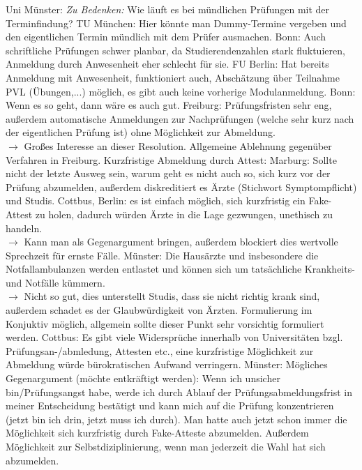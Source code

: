 \begin{outline}
        \1 Uni Münster: \textit{Zu Bedenken:} Wie läuft es bei mündlichen Prüfungen mit der Terminfindung?
          \2 TU München: Hier könnte man Dummy-Termine vergeben und den eigentlichen Termin mündlich mit dem Prüfer ausmachen.
        \1 Bonn: Auch schriftliche Prüfungen schwer planbar, da Studierendenzahlen stark fluktuieren, Anmeldung durch Anwesenheit eher schlecht für sie.
          \2 FU Berlin: Hat bereits Anmeldung mit Anwesenheit, funktioniert auch, Abschätzung über Teilnahme PVL (Übungen,...) möglich, es gibt auch keine vorherige Modulanmeldung.
          \2 Bonn: Wenn es so geht, dann wäre es auch gut.
        \1 Freiburg: Prüfungsfristen sehr eng, außerdem automatische Anmeldungen zur Nachprüfungen (welche sehr kurz nach der eigentlichen Prüfung ist) ohne Möglichkeit zur Abmeldung. \\
          $\rightarrow$ Großes Interesse an dieser Resolution.
          \2 Allgemeine Ablehnung gegenüber Verfahren in Freiburg.
        \1 Kurzfristige Abmeldung durch Attest:
          \2 Marburg: Sollte nicht der letzte Ausweg sein, warum geht es nicht auch so, sich kurz vor der Prüfung abzumelden, außerdem diskreditiert es Ärzte (Stichwort Symptompflicht) und Studis.
          \2 Cottbus, Berlin: es ist einfach möglich, sich kurzfristig ein Fake-Attest zu holen, dadurch würden Ärzte in die Lage gezwungen, unethisch zu handeln. \\
            $\rightarrow$ Kann man als Gegenargument bringen, außerdem blockiert dies wertvolle Sprechzeit für ernste Fälle.
          \2 Münster: \glqq Die Hausärzte und insbesondere die Notfallambulanzen werden entlastet und können sich um tatsächliche Krankheits- und Notfälle kümmern.\grqq \\
            $\rightarrow$ Nicht so gut, dies unterstellt Studis, dass sie nicht richtig krank sind, außerdem schadet es der Glaubwürdigkeit von Ärzten.
            \3 Formulierung im Konjuktiv möglich, allgemein sollte dieser Punkt sehr vorsichtig formuliert werden.
        \1 Cottbus: Es gibt viele Widersprüche innerhalb von Universitäten bzgl. Prüfungsan-/abmledung, Attesten etc., eine kurzfristige Möglichkeit zur Abmeldung würde bürokratischen Aufwand verringern.
        \1 Münster: Mögliches Gegenargument (möchte entkräftigt werden): Wenn ich unsicher bin/Prüfungsangst habe, werde ich durch Ablauf der Prüfungsabmeldungsfrist in meiner Entscheidung bestätigt und kann mich auf die Prüfung konzentrieren (\glqq jetzt bin ich drin, jetzt muss ich durch\grqq).
        \2 Man hatte auch jetzt schon immer die Möglichkeit sich kurzfristig durch Fake-Atteste abzumelden.
        \2 Außerdem Möglichkeit zur Selbstdiziplinierung, wenn man jederzeit die Wahl hat sich abzumelden.
      \end{outline}

